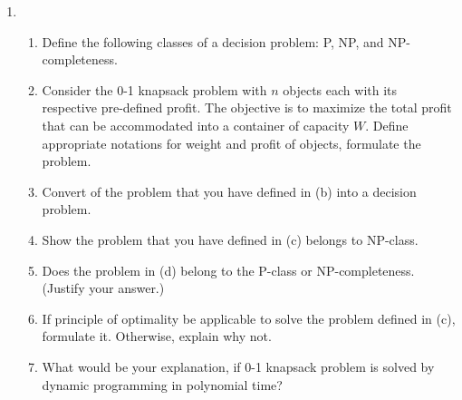\begin{enumerate}
	
	
	\item \begin{enumerate}[label=\alph*.]
		\item Define the following classes of a decision problem:  P, NP, and NP-completeness.
		\item Consider the 0-1 knapsack problem with $n$ objects each with its respective pre-defined profit.  The objective is to maximize the total profit that can be accommodated into a container of capacity $W$.  Define appropriate notations for weight and profit of objects, formulate the problem.
		\item Convert of the problem that you have defined in (b) into a decision problem.
		\item Show the problem that you have defined in (c) belongs to NP-class.
		\item Does the problem in (d) belong to the P-class or NP-completeness. (Justify your answer.)
		\item If principle of optimality be applicable to solve the problem defined in (c), formulate it.  Otherwise, explain why not.  
		\item What would be your explanation, if 0-1 knapsack problem is solved by dynamic programming in polynomial time?
	\end{enumerate}
	
	
\end{enumerate}


